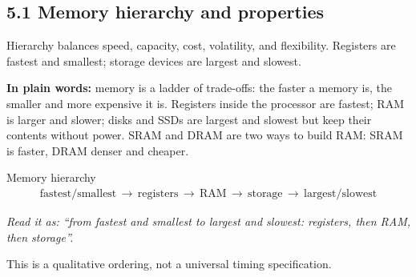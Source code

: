 \documentclass[11pt]{article}
\begin{document}
\begin{keepsection}
\section{5.1 Memory hierarchy and properties}

Hierarchy balances speed, capacity, cost, volatility, and flexibility. Registers are fastest and smallest; storage devices are largest and slowest.

\begin{plainbox}\textbf{In plain words:} memory is a ladder of trade-offs: the faster a memory is, the smaller and more expensive it is. Registers inside the processor are fastest; RAM is larger and slower; disks and SSDs are largest and slowest but keep their contents without power. SRAM and DRAM are two ways to build RAM: SRAM is faster, DRAM denser and cheaper.\end{plainbox}

\begin{equationcard}{Memory hierarchy}
\[ \begin{gathered} \text{fastest}/\text{smallest}\, \to \, \text{registers}\, \to \, \text{RAM}\, \to \, \text{storage}\, \to \, \text{largest}/\text{slowest} \end{gathered} \]
{\small \emph{Read it as: “from fastest and smallest to largest and slowest: registers, then RAM, then storage”.}\par This is a qualitative ordering, not a universal timing specification.}
\end{equationcard}

\begin{center}
\begin{minipage}[t]{0.950\linewidth}\centering
{}\par{}\end{minipage}
\end{center}


\end{keepsection}
\end{document}
